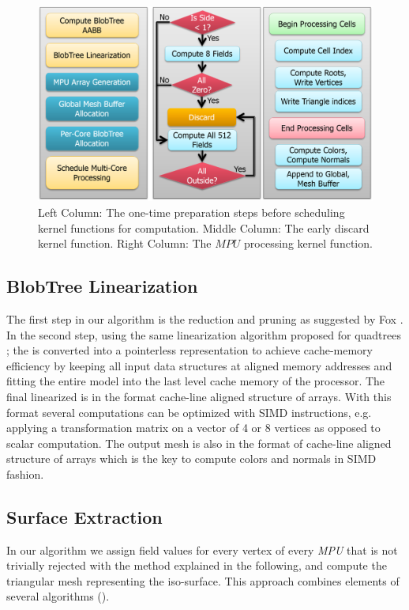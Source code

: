 \begin{figure}[H]
  \centering
  \includegraphics[width=0.9\linewidth]{figures/cpupoly/AlgorithmHighLevelView}
  \caption{\label{fig:AlgorithmHighLevelView}
  {Left Column: The one-time preparation steps before scheduling kernel functions for computation.
  Middle Column: The early discard kernel function. Right Column: The $MPU$ processing kernel function.}
}
\end{figure}

\subsection{BlobTree Linearization}\label{sec:linearization}
The first step in our algorithm is the \blob reduction and pruning as suggested by Fox \etal \cite{Fox2002}.
In the second step, using the same linearization algorithm proposed for quadtrees \cite{Lee2000}; the \blob is converted into 
a pointerless representation to achieve cache-memory efficiency by keeping all input data structures at 
aligned memory addresses and fitting the entire \blob model into the last level cache memory of the processor. 
The final linearized \blob is in the format cache-line aligned structure of arrays. With this format several computations
can be optimized with SIMD instructions, e.g. applying a transformation matrix on a vector of 4 or 8 vertices as opposed to
scalar computation. The output mesh is also in the format of cache-line aligned structure of arrays which is the key to
compute colors and normals in SIMD fashion. 



\subsection{Surface Extraction}\label{sec:surfaceextraction}
In our algorithm we assign field values for every vertex of every \textit{MPU} that is not trivially rejected with the method explained in 
the following, and compute the triangular mesh representing the iso-surface. This approach combines elements of several algorithms 
(\cite{Wyvill1986, Lorensen1987, Bloomenthal1994a}).


